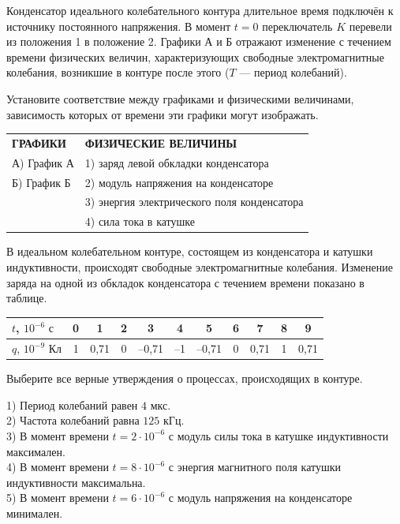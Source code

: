 \begin{taskbasic}[code={\label{task:elem_osc_v6_n15}}]
Конденсатор идеального колебательного контура длительное время подключён к источнику постоянного напряжения. В момент $t = 0$ переключатель $K$ перевели из положения 1 в положение 2. Графики А и Б отражают изменение с течением времени физических величин, характеризующих свободные электромагнитные колебания, возникшие в контуре после этого ($T$ --- период колебаний).

Установите соответствие между графиками и физическими величинами, зависимость которых от времени эти графики могут изображать.

\smallskip
\begin{tabular}{p{}p{}}
\textbf{ГРАФИКИ} & \textbf{ФИЗИЧЕСКИЕ ВЕЛИЧИНЫ} \\
А) График А & 1) заряд левой обкладки конденсатора \\
Б) График Б & 2) модуль напряжения на конденсаторе \\
& 3) энергия электрического поля конденсатора \\
& 4) сила тока в катушке
\end{tabular}

\end{taskbasic}

\begin{taskbasic}[code={\label{task:elem_osc_v7_n14}}]
В идеальном колебательном контуре, состоящем из конденсатора и катушки индуктивности, происходят свободные электромагнитные колебания. Изменение заряда на одной из обкладок конденсатора с течением времени показано в таблице.

\nopagebreak\smallskip
\begin{center}
\small
\begin{tabular}{|l|c|c|c|c|c|c|c|c|c|c|}
\hline
$t$, $10^{-6}\text{ с}$ & 0 & 1 & 2 & 3 & 4 & 5 & 6 & 7 & 8 & 9 \\ \hline
$q$, $10^{-9}\text{ Кл}$ & 1 & 0,71 & 0 & --0,71 & --1 & --0,71 & 0 & 0,71 & 1 & 0,71 \\ \hline
\end{tabular}
\end{center}
\smallskip

Выберите все верные утверждения о процессах, происходящих в контуре.

1) Период колебаний равен $4\text{ мкс}$.\\
2) Частота колебаний равна $125\text{ кГц}$.\\
3) В момент времени $t = 2\cdot 10^{-6}\text{ с}$ модуль силы тока в катушке индуктивности максимален.\\
4) В момент времени $t = 8\cdot 10^{-6}\text{ с}$ энергия магнитного поля катушки индуктивности максимальна.\\
5) В момент времени $t = 6\cdot 10^{-6}\text{ с}$ модуль напряжения на конденсаторе минимален.

\end{taskbasic}

